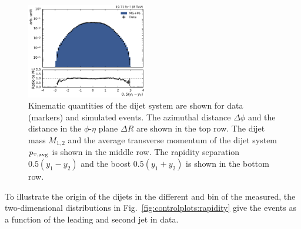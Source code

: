 \begin{figure}[htbp]
    \includegraphics[width=0.47\textwidth]{figures/measurement/dijet_quantities_dijet_ystar.pdf}
    \caption[Kinematic quantities of the dijet system]{Kinematic quantities of
    the dijet system are shown for data (markers) and simulated events. The
azimuthal distance $\Delta\phi$ and the distance in the $\phi$-$\eta$ plane
$\Delta R$ are shown in the top row. The dijet mass $M_{1,2}$ and the average
transverse momentum of the dijet system $\ptavg$ is shown in the middle row. The
rapidity separation $0.5(y_1 - y_2)$ and the boost $0.5(y_1+y_2)$ is shown in
the bottom row.}
    \label{fig:controlplots:dijets}
\end{figure}


To illustrate the origin of the dijets in the different \ystar and \yboost bin
of the measured, the two-dimensional distributions in
Fig.~\ref{fig:controlplots:rapidity} give the events as a function of the
leading and second jet in data.

